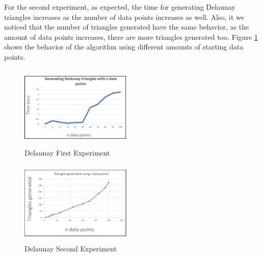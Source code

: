 \documentclass[conference]{IEEEtran}
\begin{document}
For the second experiment, as expected, the time for generating Delaunay triangles increases as the number of data points increases as well. Also, it we noticed that the number of triangles generated have the same behavior, as the amount of data points increases, there are more triangles generated too. Figure \ref{fig:delaunayResult1} shows the behavior of the algorithm using different amounts of starting data points.

\begin{figure}[H]
    \centering
    \includegraphics[width=200,height=150,keepaspectratio]{DelaunayGraph.png}
    \caption{Delaunay First Experiment}
    \label{fig:delaunayResult1}
\end{figure}

\begin{figure}[H]
    \centering
    \includegraphics[width=200,height=150,keepaspectratio]{DelaunayGraph2.png}
    \caption{Delaunay Second Experiment}
    \label{fig:delaunayResult2}
\end{figure}
\end{document}
